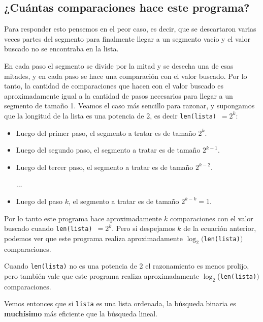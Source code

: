 
\subsection*{¿Cuántas comparaciones hace este programa?}

Para responder esto pensemos en el peor caso, es decir, que se descartaron
varias veces partes del segmento para finalmente llegar a un segmento vacío y
el valor buscado no se encontraba en la lista.

En cada paso el segmento se divide por la mitad y se desecha una de esas
mitades, y en cada paso se hace una comparación con el valor buscado. Por lo
tanto, la cantidad de comparaciones que hacen con el valor buscado es
aproximadamente igual a la cantidad de pasos necesarios para llegar a un
segmento de tamaño 1.
Veamos el caso más sencillo para razonar, y supongamos que la longitud de la
lista es una potencia de 2, es decir \lstinline+len(lista)+~$= 2^k$:

\begin{itemize}
\item Luego del primer paso, el segmento a tratar es de tamaño $2^k$.
\item Luego del segundo paso, el segmento a tratar es de tamaño $2^{k-1}$.
\item Luego del tercer paso, el segmento a tratar es de tamaño $2^{k-2}$.

$\ldots$

\item Luego del paso $k$, el segmento a tratar es de tamaño $2^{k-k}=1$.
\end{itemize}

Por lo tanto este programa hace aproximadamente $k$ comparaciones con el valor
buscado cuando \lstinline+len(lista)+~$= 2^k$.
Pero si despejamos $k$ de la ecuación anterior, podemos ver que este programa
realiza aproximadamente $\log_2($\lstinline+len(lista)+$)$ comparaciones.

Cuando \lstinline+len(lista)+ no es una potencia de 2 el razonamiento es menos
prolijo, pero también vale que este programa realiza aproximadamente
$\log_2$(\lstinline+len(lista)+$)$ comparaciones.

\begin{observacion}
Vemos entonces que si \lstinline!lista! es una lista ordenada, la búsqueda binaria es
{\bf muchísimo} más eficiente que la búsqueda lineal.
\end{observacion}

